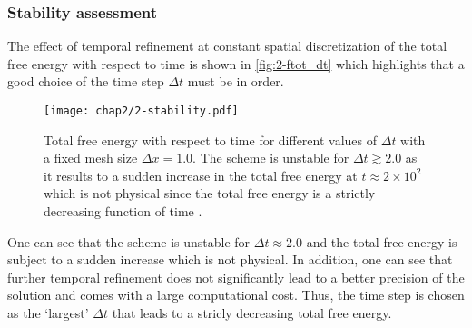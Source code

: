     \subsubsection{Stability assessment}
    The effect of temporal refinement at constant spatial discretization of the total free energy with respect to time is shown in \autoref{fig:2-ftot_dt} which highlights that a good choice of the time step $\Delta t$ must be in order.
    \begin{figure}[H]
        \centering
        \texttt{[image: chap2/2-stability.pdf]}
        \caption{Total free energy with respect to time for different values of $\Delta t$ with a fixed mesh size $\Delta x=1.0$. The scheme is unstable for $\Delta t \gtrsim 2.0$ as it results to a sudden increase in the total free energy at $t\approx 2\times10^2$ which is not physical since the total free energy is a strictly decreasing function of time \cite{Gottstein2004,MoelansBlanpainWollants2008,LeeHuhJeongShinYunKim2014}.}
        \label{fig:2-ftot_dt}
    \end{figure}
    One can see that the scheme is unstable for $\Delta t \approx 2.0$ and the total free energy is subject to a sudden increase which is not physical. In addition, one can see that further temporal refinement does not significantly lead to a better precision of the solution and comes with a large computational cost. Thus, the time step is chosen as the `largest' $\Delta t$ that leads to a stricly decreasing total free energy.

